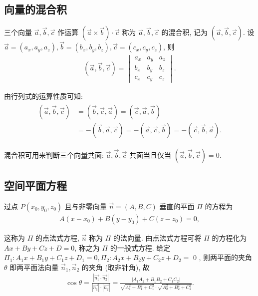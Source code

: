 \subsection{向量的混合积}
三个向量 $\vec{a} , \vec{b} , \vec{c}$ 作运算 $(\vec{a} \times \vec{b}) \cdot \vec{c}$ 称为 $\vec{a} , \vec{b} , \vec{c}$ 的混合积, 记为 $(\vec{a}, \vec{b}, \vec{c})$.
设 $\vec{a}=\left(a_x, a_y, a_z\right), \vec{b}=\left(b_x, b_y, b_z\right), \vec{c}=\left(c_x, c_y, c_z\right)$, 则
\begin{align*}
	(\vec{a}, \vec{b}, \vec{c})=\begin{vmatrix}
		                            a_x & a_y & a_z \\
		                            b_x & b_y & b_z \\
		                            c_x & c_y & c_z
	                            \end{vmatrix} .
\end{align*}

由行列式的运算性质可知:
\begin{align*}
	\begin{aligned}
		{(\vec{a}, \vec{b}, \vec{c}) } & =(\vec{b}, \vec{c}, \vec{a})=(\vec{c}, \vec{a}, \vec{b})                                  \\
		                               & =-(\vec{b}, \vec{a}, \vec{c})=-(\vec{a}, \vec{c}, \vec{b})=-(\vec{c}, \vec{b}, \vec{a}) .
	\end{aligned}
\end{align*}

混合积可用来判断三个向量共面: $\vec{a}, \vec{b}, \vec{c}$ 共面当且仅当 $(\vec{a}, \vec{b}, \vec{c})=0$.

\subsection{空间平面方程}
过点 $P\left(x_0, y_0, z_0\right)$ 且与非零向量 $\vec{n}=(A, B, C)$ 垂直的平面 $\Pi$ 的方程为
\begin{align*}
	A\left(x-x_0\right)+B\left(y-y_0\right)+C\left(z-z_0\right)=0,
\end{align*}

这称为 $\Pi$ 的点法式方程, $\vec{n}$ 称为 $\Pi$ 的法向量.
由点法式方程可将 $\Pi$ 的方程化为 $A x+B y+C z+D=0$, 称之为 $\Pi$ 的一般式方程. 给定 $\Pi_1: A_1 x+B_1 y+C_1 z+D_1=0, \Pi_2: A_2 x+B_2 y+C_2 z+D_2=$ 0 , 则两平面的夹角 $\theta$ 即两平面法向量 $\vec{n}_1, \vec{n}_2$ 的夹角 (取非针角), 故
\begin{align*}
	\cos \theta=\frac{\left|\overrightarrow{n_1} \cdot \overrightarrow{n_2}\right|}{\left|\overrightarrow{n_1}\right| \cdot\left|\overrightarrow{n_2}\right|}=\frac{\left|A_1 A_2+B_1 B_2+C_1 C_2\right|}{\sqrt{A_1^2+B_1^2+C_1^2} \cdot \sqrt{A_2^2+B_2^2+C_2^2}} .
\end{align*}

